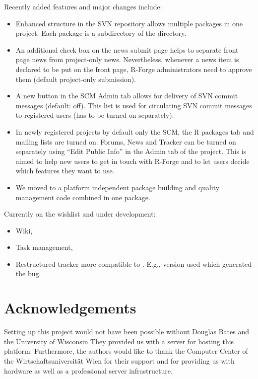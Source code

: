 Recently added features and major changes include:
\begin{itemize}
\item Enhanced structure in the SVN repository allows multiple
  packages in one project. Each package is a subdirectory of the
   directory.
\item An additional check box on the news submit page helps to
  separate front page news from project-only news. Nevertheless,
  whenever a news item is declared to be put on the front page,
  R-Forge administrators need to approve them (default project-only
  submission).
\item A new button in the SCM Admin tab allows for delivery of SVN
  commit messages (default: off).  This
  list is used for circulating SVN commit messages to registered
  users (has to be turned on separately).
\item In newly registered projects by default only the SCM, the R
  packages tab and mailing lists are turned on. Forums, News and
  Tracker can be turned on separately using ``Edit Public Info'' in
  the Admin tab of the project. This is aimed to help new users to get
  in touch with R-Forge and to let users decide which features they
  want to use.
\item We moved to a platform independent package building and quality
  management code combined in one \R{} package.
\end{itemize}

Currently on the wishlist and under development:
\begin{itemize}
\item Wiki,
\item Task management,
\item Restructured tracker more compatible to \R{}. E.g., \R{} version
  used which generated the bug.  
\end{itemize}


\section{Acknowledgements}

Setting up this project would not have been possible without Douglas
Bates and the University of Wisconsin 
They provided us with a server for hosting this platform. Furthermore,
the authors would like to thank the Computer Center 
of the Wirtschaftsuniversit\"at Wien for
their support and for providing us with hardware as well as a
professional server infrastructure.

